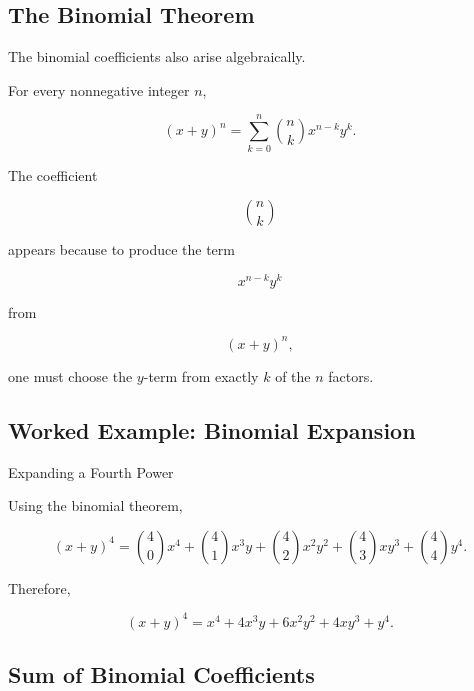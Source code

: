 \subsection{The Binomial Theorem}
\label{subsec:binomial-theorem-basic}

The binomial coefficients also arise algebraically.

\begin{theorem}
For every nonnegative integer \(n\),

\[
\boxed{
(x+y)^n
=
\sum_{k=0}^{n}
\binom{n}{k}
x^{n-k}y^k.
}
\]
\end{theorem}

The coefficient

\[
\binom{n}{k}
\]

appears because to produce the term

\[
x^{n-k}y^k
\]

from

\[
(x+y)^n,
\]

one must choose the \(y\)-term from exactly \(k\) of the \(n\)
factors.

\subsection{Worked Example: Binomial Expansion}
\label{subsec:worked-binomial-expansion}

\begin{workedexamplebox}{Expanding a Fourth Power}

Using the binomial theorem,

\[
(x+y)^4
=
\binom{4}{0}x^4
+
\binom{4}{1}x^3y
+
\binom{4}{2}x^2y^2
+
\binom{4}{3}xy^3
+
\binom{4}{4}y^4.
\]

Therefore,

\begin{answerbox}
\[
\boxed{
(x+y)^4
=
x^4+4x^3y+6x^2y^2+4xy^3+y^4.
}
\]
\end{answerbox}

\end{workedexamplebox}

\subsection{Sum of Binomial Coefficients}
\label{subsec:sum-binomial-coefficients}

